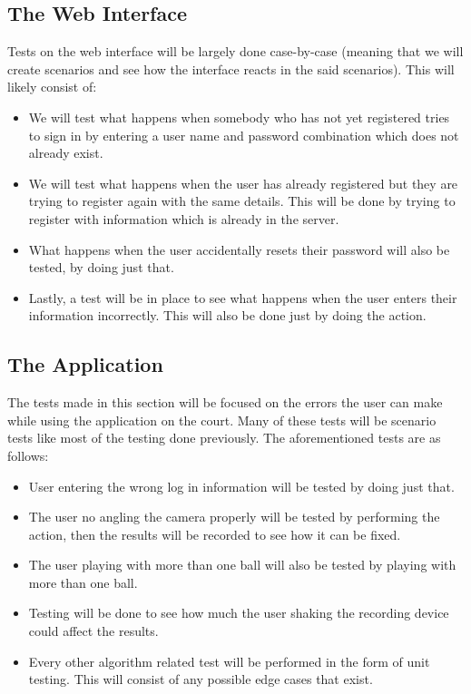 \documentclass{article}
\begin{document}
\subsection{The Web Interface}
Tests on the web interface will be largely done case-by-case (meaning that we will create scenarios and see how the interface reacts in the said scenarios). This will likely consist of:
\begin{itemize}
    \item We will test what happens when somebody who has not yet registered tries to sign in by entering a user name and password combination which does not already exist.
    \item We will test what happens when the user has already registered but they are trying to register again with the same details. This will be done by trying to register with information which is already in the server.
    \item What happens when the user accidentally resets their password will also be tested, by doing just that.
    \item Lastly, a test will be in place to see what happens when the user enters their information incorrectly. This will also be done just by doing the action.
\end{itemize}

\subsection{The Application}
The tests made in this section will be focused on the errors the user can make while using the application on the court. Many of these tests will be scenario tests like most of the testing done previously. The aforementioned tests are as follows:
\begin{itemize}
    \item User entering the wrong log in information will be tested by doing just that.
    \item The user no angling the camera properly will be tested by performing the action, then the results will be recorded to see how it can be fixed.
    \item The user playing with more than one ball will also be tested by playing with more than one ball.
    \item Testing will be done to see how much the user shaking the recording device could affect the results.
    \item Every other algorithm related test will be performed in the form of unit testing. This will consist of any possible edge cases that exist.
\end{itemize}
\end{document}
